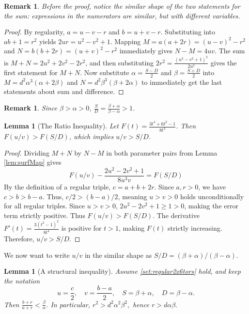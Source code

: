 \documentclass{article}
\theoremstyle{plain}
\newtheorem{lemma}[theorem]{Lemma}
\newtheorem{remark}[theorem]{Remark}
\begin{document}
\begin{remark}
    Before the proof, notice the similar shape of the two statements for the sum: expressions in the numerators are similar, but with different variables.
\end{remark}

\begin{proof}
By regularity, $a = u-v-r$ and $b = u+v-r$. Substituting into $ab+1=r^2$ yields $2ur = u^2 - v^2 + 1$. 
Mapping $M = a(a+2r) = (u-v)^2 - r^2$ and $N = b(b+2r) = (u+v)^2 - r^2$ immediately gives $N-M = 4uv$.
The sum is $M+N = 2u^2 + 2v^2 - 2r^2$, and then substituting $2r^2 = \frac{(u^2-v^2+1)^2}{2u^2}$ gives the first statement for $M+N$.
Now substitute $\alpha = \frac{S-D}{2}$ and $\beta = \frac{S+D}{2}$ into $M = d^2 \alpha^3(\alpha+2\beta)$ and $N = d^2 \beta^3(\beta+2\alpha)$ to immediately get the last statements about sum and difference.
\end{proof}

\begin{remark}
    Since $\beta > \alpha > 0$, $\frac SD = \frac{\beta+\alpha}{\beta-\alpha}>1$.
\end{remark}

\begin{lemma}[The Ratio Inequality]\label{lem:ratioIneq}
Let $F(t) = \frac{3t^4 + 6t^2 - 1}{8t^3}$. Then $F(u/v) > F(S/D)$, which implies $u/v > S/D$.
\end{lemma}

\begin{proof}
Dividing $M+N$ by $N-M$ in both parameter pairs from Lemma \ref{lem:surfMap} gives
\[ F(u/v) - \frac{2u^2 - 2v^2 + 1}{8u^3v} = F(S/D) \]
By the definition of a regular triple, $c = a+b+2r$. Since $a, r > 0$, we have $c > b > b-a$. Thus, $c/2 > (b-a)/2$, meaning $u > v > 0$ holds unconditionally for all regular triples.
Since $u > v > 0$, $2u^2 - 2v^2 + 1 \geqslant 1 > 0$, making the error term strictly positive.
Thus $F(u/v) > F(S/D)$. The derivative $F'(t) = \frac{3(t^2-1)^2}{8t^4}$ is positive for $t > 1$, making $F(t)$ strictly increasing. Therefore, $u/v > S/D$.
\end{proof}

We now want to write \(u/v\) in the similar shape as \(S/D=(\beta+\alpha)/(\beta-\alpha).\)

\begin{lemma}[A structural inequality]\label{lem:BA-lt-betaalpha}
Assume \cref{set:regular2x6tors} hold, and keep the notation
\[
u=\frac c2,\quad v=\frac{b-a}{2},\quad
S=\beta+\alpha,\quad D=\beta-\alpha.
\]
Then
\( \frac{b+r}{a+r}<\frac{\beta}{\alpha} \).
In particular,
\(
r^2>d^2\alpha^2\beta^2,
\)
hence
\(
r > d \alpha\beta.
\)
\end{lemma}
\end{document}
